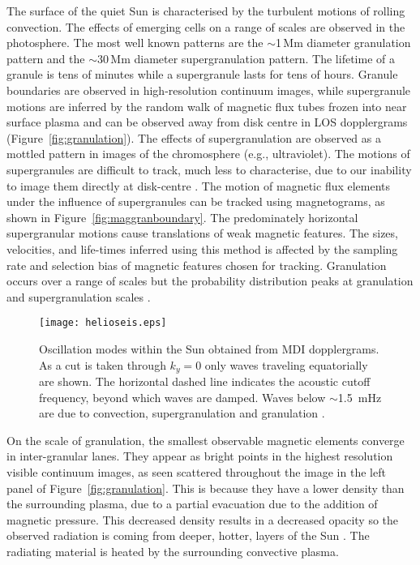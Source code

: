 The surface of the quiet Sun is characterised by the turbulent motions of rolling convection. The effects of emerging cells on a range of scales are observed in the photosphere. The most well known patterns are the $\sim$1\,Mm diameter granulation pattern and the $\sim$30\,Mm diameter supergranulation pattern. The lifetime of a granule is tens of minutes while a supergranule lasts for tens of hours. Granule boundaries are observed in high-resolution continuum images, while supergranule motions are inferred by the random walk of magnetic flux tubes frozen into near surface plasma and can be observed away from disk centre in \gls{LOS} dopplergrams (Figure~\ref{fig:granulation}). The effects of supergranulation are observed as a mottled pattern in images of the chromosphere (e.g., ultraviolet). The motions of supergranules are difficult to track, much less to characterise, due to our inability to image them directly at disk-centre \citep[see][and references therein]{Rieutord:2010}. The motion of magnetic flux elements under the influence of supergranules can be tracked using magnetograms, as shown in Figure~\ref{fig:maggranboundary}. The predominately horizontal supergranular motions cause translations of weak magnetic features. The sizes, velocities, and life-times inferred using this method is affected by the sampling rate and selection bias of magnetic features chosen for tracking. Granulation occurs over a range of scales but the probability distribution peaks at granulation and supergranulation scales \citep{Rieutord:2008}. 

 \begin{figure}[]    %
   \centerline{\texttt{[image: helioseis.eps]}
              }
              \caption[Oscillation modes within the Sun.]{Oscillation modes within the Sun obtained from MDI dopplergrams. As a cut is taken through $k_y=0$ only waves traveling equatorially are shown. The horizontal dashed line indicates the acoustic cutoff frequency, beyond which waves are damped. Waves below $\sim$1.5~mHz are due to convection, supergranulation and granulation \citep[from][]{Gizon:2010}.}
   \label{fig:photosc}
   \end{figure}

On the scale of granulation, the smallest observable magnetic elements converge in inter-granular lanes. They appear as bright points in the highest resolution visible continuum images, as seen scattered throughout the image in the left panel of Figure~\ref{fig:granulation}. This is because they have a lower density than the surrounding plasma, due to a partial evacuation due to the addition of magnetic pressure. This decreased density results in a decreased opacity so the observed radiation is coming from deeper, hotter, layers of the Sun \citep{Spruit:1976}. The radiating material is heated by the surrounding convective plasma. 
 
